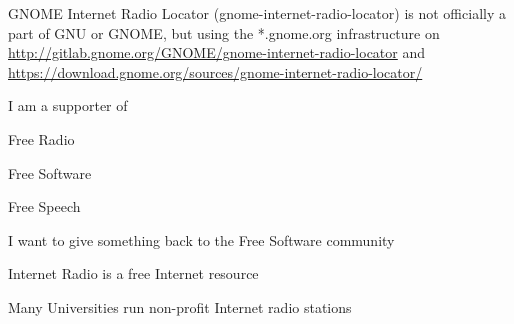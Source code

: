 \documentclass[20pt,landscape]{foils}
\begin{document}
GNOME Internet Radio Locator (gnome-internet-radio-locator) is not
officially a part of GNU or GNOME, but using the *.gnome.org
infrastructure
on\\ \url{http://gitlab.gnome.org/GNOME/gnome-internet-radio-locator}
and\\ \url{https://download.gnome.org/sources/gnome-internet-radio-locator/}


\begin{list1}
\item I am a supporter of
  \begin{list2}
  \item Free Radio
  \item Free Software
  \item Free Speech
  \end{list2}
\item I want to give something back to the Free Software community
\item Internet Radio is a free Internet resource
\item Many Universities run non-profit Internet radio stations
\end{list1}

\end{document}
